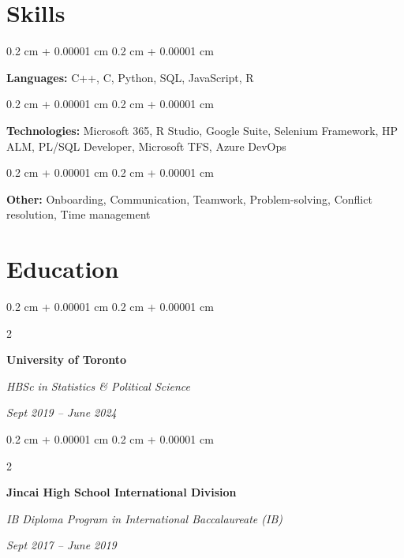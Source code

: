 \documentclass[10pt, letterpaper]{article}
\newenvironment{onecolentry}{
    \begin{adjustwidth}{
        0.2 cm + 0.00001 cm
    }{
        0.2 cm + 0.00001 cm
    }
}{
    \end{adjustwidth}
} %
\newenvironment{twocolentry}[2][]{
    \onecolentry
    \def\secondColumn{#2}
    \setcolumnwidth{\fill, 4.5 cm}
    \begin{paracol}{2}
}{
    \switchcolumn \raggedleft \secondColumn
    \end{paracol}
    \endonecolentry
} %
\begin{document}
    
    \section{Skills}



        
        \begin{onecolentry}
            \textbf{Languages:} C++, C, Python, SQL, JavaScript, R
        \end{onecolentry}

        \vspace{0.2 cm}

        \begin{onecolentry}
            \textbf{Technologies:} Microsoft 365, R Studio, Google Suite, Selenium Framework, HP ALM, PL/SQL Developer, Microsoft TFS, Azure DevOps
        \end{onecolentry}

        \vspace{0.2 cm}

        \begin{onecolentry}
            \textbf{Other:} Onboarding, Communication, Teamwork, Problem-solving, Conflict resolution, Time management
        \end{onecolentry}


    
    \section{Education}



        
        \begin{twocolentry}{
            
            
        \textit{Sept 2019 – June 2024}}
            \textbf{University of Toronto}

            \textit{HBSc in Statistics \& Political Science}
        \end{twocolentry}



        \vspace{0.2 cm}

        \begin{twocolentry}{
            
            
        \textit{Sept 2017 – June 2019}}
            \textbf{Jincai High School International Division}

            \textit{IB Diploma Program in International Baccalaureate (IB)}
        \end{twocolentry}
\end{document}
